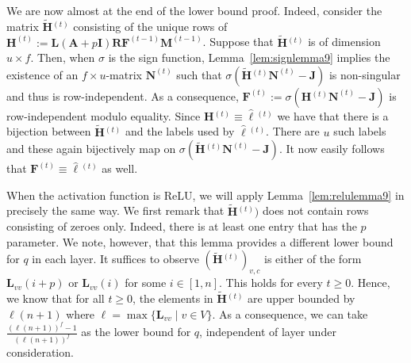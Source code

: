 We are now almost at the end of the lower bound proof. Indeed,
consider the matrix $\widetilde{\mathbf{H}}{}^{(t)}$ consisting of the unique rows
of $\mathbf{H}^{(t)}:=\mathbf{L}(\mathbf{A}+p\mathbf{I})\mathbf{R}\mathbf{F}^{(t-1)}\mathbf{M}^{(t-1)}$. Suppose that $\widetilde{\mathbf{H}}{}^{(t)}$ is of dimension $u\times f$.
Then, when $\sigma$ is the sign function, Lemma~\ref{lem:signlemma9} implies 
the existence of an $f\times u$-matrix $\mathbf{N}^{(t)}$ such that
$\sigma(\widetilde{\mathbf{H}}{}^{(t)}\mathbf{N}^{(t)}-\mathbf{J})$ is non-singular
and thus is row-independent. As a consequence, 
$\mathbf{F}^{(t)}:=\sigma(\mathbf{H}{}^{(t)}\mathbf{N}^{(t)}-\mathbf{J})$ is 
row-independent modulo equality. Since  $\mathbf{H}{}^{(t)}\equiv\hat{\pmb{\ell}}{}^{(t)}$
we have that there is a bijection between $\widetilde{\mathbf{H}}{}^{(t)}$ and the labels
used by $\hat{\pmb{\ell}}{}^{(t)}$. There are $u$ such labels and these again bijectively
map on $\sigma(\widetilde{\mathbf{H}}{}^{(t)}\mathbf{N}^{(t)}-\mathbf{J})$.
It now easily follows that
$\mathbf{F}^{(t)}\equiv\hat{\pmb{\ell}}{}^{(t)}$ as well.

When the activation function is ReLU, we will apply Lemma~\ref{lem:relulemma9} in precisely the same way. We first remark that $\widetilde{\mathbf{H}}{}^{(t)})$ does not contain rows consisting of zeroes only. Indeed, there is at least one entry that has the $p$ parameter.
We note, however, that this lemma provides a different lower bound for $q$ in each layer. It suffices to observe $(\widetilde{\mathbf{H}}{}^{(t)})_{v,c}$ is either of the form $\mathbf{L}_{vv}(i+p)$ or $\mathbf{L}_{vv}(i)$ for some $i\in [1,n]$. This holds for every $t\geq 0$. Hence, we know that for all $t\geq 0$, the elements in 
$\widetilde{\mathbf{H}}{}^{(t)}$ are upper bounded by $\ell(n+1)$ where $\ell=\max\{\mathbf{L}_{vv}\mid v\in V\}$. As a consequence, we can take 
$\frac{(\ell(n+1))^f-1}{(\ell(n+1))^f}$ as the lower bound for $q$, independent of layer under consideration.

